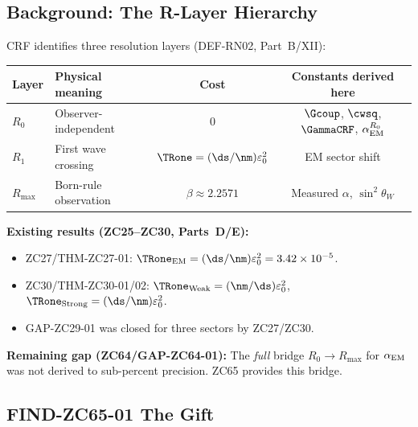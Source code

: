 \documentclass[12pt, a4paper]{article}
\renewcommand{\swsq}{\sin^2\!\theta_W}
\renewcommand{\aEM}{\alpha_{\rm EM}}
\begin{document}
\subsection{Background: The R-Layer Hierarchy}
\label{sec:background}

\begin{keybox}[title={The Three Resolution Layers}]
CRF identifies three resolution layers (DEF-RN02, Part~B/XII):

\medskip
\begin{center}
{\small\renewcommand{\arraystretch}{1.30}
\begin{tabular}{@{}llcc@{}}
\toprule
Layer & Physical meaning & Cost & Constants derived here \\
\midrule
$R_0$ & Observer-independent & $0$ & $\Gcoup$, $\cwsq$, $\GammaCRF$, $\aEM^{R_0}$ \\
$R_1$ & First wave crossing & $\TRone = (\ds/\nm)\varepsilon_0^2$ & EM sector shift \\
$R_{\max}$ & Born-rule observation & $\beta \approx 2.2571$ & Measured $\alpha$, $\swsq$ \\
\bottomrule
\end{tabular}
}
\end{center}

\medskip
\textbf{Existing results (ZC25--ZC30, Parts~D/E):}
\begin{itemize}[leftmargin=2em, noitemsep]
  \item ZC27/THM-ZC27-01: $\TRone_{\rm EM} = (\ds/\nm)\varepsilon_0^2 = 3.42\times10^{-5}$.
  \item ZC30/THM-ZC30-01/02: $\TRone_{\rm Weak} = (\nm/\ds)\varepsilon_0^2$,
    $\TRone_{\rm Strong} = (\ds/\nm)\varepsilon_0^2$.
  \item GAP-ZC29-01 was closed for three sectors by ZC27/ZC30.
\end{itemize}

\textbf{Remaining gap (ZC64/GAP-ZC64-01):}
The \emph{full} bridge $R_0 \to R_{\max}$ for $\aEM$
was not derived to sub-percent precision.
ZC65 provides this bridge.
\end{keybox}

\subsection{FIND-ZC65-01 \quad The Gift}
\label{sec:find01}
\end{document}
